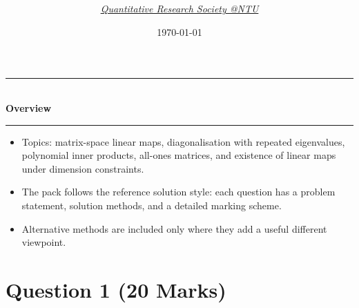 \documentclass[12pt]{article}
\title{
\Huge \CourseCode\ \CourseName \\[0.3em]
\Large \DocType  \\[0.3em]
\large \ExamMeta
}
\author{
  \textit{\href{https://qrsntu.org}{Quantitative Research Society @NTU}}
}
\date{\today}
\newenvironment{overview}{
  \par\bigskip
  \begin{center}
    \rule{0.92\linewidth}{0.6pt}\\[-0.2em]
    \textbf{Overview}\\[-0.2em]
    \rule{0.92\linewidth}{0.6pt}
  \end{center}
  \vspace{-0.3em}
  \begin{itemize}[leftmargin=1.6em, itemsep=0.2em, topsep=0.2em]
}{
  \end{itemize}
  \par\bigskip
}
\begin{document}
\maketitle
\thispagestyle{plainfirst}
\pagestyle{main}


\begin{overview}
  \item Topics: matrix-space linear maps, diagonalisation with repeated eigenvalues, polynomial inner products, all-ones matrices, and existence of linear maps under dimension constraints.
  \item The pack follows the reference solution style: each question has a problem statement, solution methods, and a detailed marking scheme.
  \item Alternative methods are included only where they add a useful different viewpoint.
\end{overview}


\newpage
\tableofcontents
\newpage

\section{Question 1 \hfill (20 Marks)}
\end{document}
